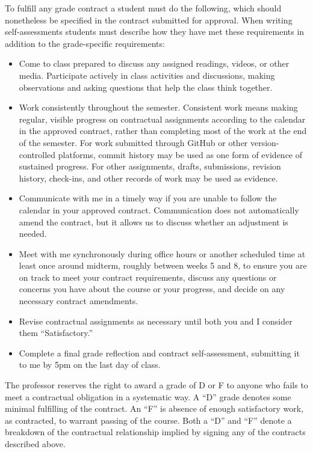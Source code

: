 \documentclass[
]{book}
\newcounter{none} %
\begin{document}
To fulfill any grade contract a student must do the following, which should nonetheless be specified in the contract submitted for approval. When writing self-assessments students must describe how they have met these requirements in addition to the grade-specific requirements:

\begin{itemize}
\item
  Come to class prepared to discuss any assigned readings, videos, or other media. Participate actively in class activities and discussions, making observations and asking questions that help the class think together.
\item
  Work consistently throughout the semester. Consistent work means making regular, visible progress on contractual assignments according to the calendar in the approved contract, rather than completing most of the work at the end of the semester. For work submitted through GitHub or other version-controlled platforms, commit history may be used as one form of evidence of sustained progress. For other assignments, drafts, submissions, revision history, check-ins, and other records of work may be used as evidence.
\item
  Communicate with me in a timely way if you are unable to follow the calendar in your approved contract. Communication does not automatically amend the contract, but it allows us to discuss whether an adjustment is needed.
\item
  Meet with me synchronously during office hours or another scheduled time at least once around midterm, roughly between weeks 5 and 8, to ensure you are on track to meet your contract requirements, discuss any questions or concerns you have about the course or your progress, and decide on any necessary contract amendments.
\item
  Revise contractual assignments as necessary until both you and I consider them ``Satisfactory.''
\item
  Complete a final grade reflection and contract self-assessment, submitting it to me by 5pm on the last day of class.
\end{itemize}

The professor reserves the right to award a grade of D or F to anyone who fails to meet a contractual obligation in a systematic way. A ``D'' grade denotes some minimal fulfilling of the contract. An ``F'' is absence of enough satisfactory work, as contracted, to warrant passing of the course. Both a ``D'' and ``F'' denote a breakdown of the contractual relationship implied by signing any of the contracts described above.
\end{document}
